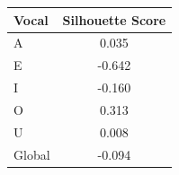 \begin{tabular}{lc}
\toprule
\rowcolor{col01}
Vocal & Silhouette Score \\
\midrule
A & 0.035 \\
E & -0.642 \\
I & -0.160 \\
O & 0.313 \\
U & 0.008 \\
Global & -0.094 \\
\bottomrule
\end{tabular}

